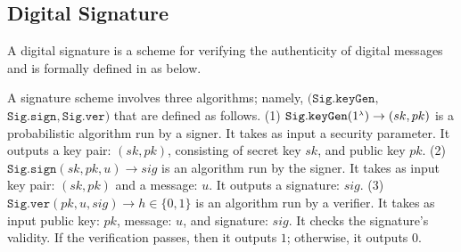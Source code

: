 \vspace{-4mm}

\subsection{Digital Signature}\label{subsec:DS}
\vspace{-1mm}


A digital signature is a scheme for verifying the authenticity of digital messages and is formally defined in \cite{DBLP:books/crc/KatzLindell2014}  as below.
%
%
\vspace{-1mm}
\begin{definition}\label{sec::def}
A signature scheme  involves three algorithms; namely, $(\mathtt{Sig.keyGen}, $ $\mathtt{Sig.sign}, \mathtt{Sig.ver})$ that are defined as follows. (1) $\mathtt{Sig.keyGen}(1^{\scriptscriptstyle \lambda})\rightarrow (sk,pk)$ is a probabilistic algorithm run by  a  signer. It takes as input a security parameter. It outputs a key pair: $(sk,pk)$, consisting of secret key $sk$, and public key $pk$. (2) $\mathtt{Sig.sign}(sk, pk, u)\rightarrow sig$ is an algorithm run by the signer. It takes as input  key pair: $(sk,pk)$ and a message: $u$. It outputs a signature: $sig$. (3) $\mathtt{Sig.ver}( pk, u, sig)\rightarrow h\in\{0,1\}$ is an algorithm run by a verifier. It takes as input  public key: $pk$,  message: $u$, and signature: $sig$. It checks the signature's validity.   If the verification passes, then it outputs $1$; otherwise, it outputs $0$. 
\end{definition}


